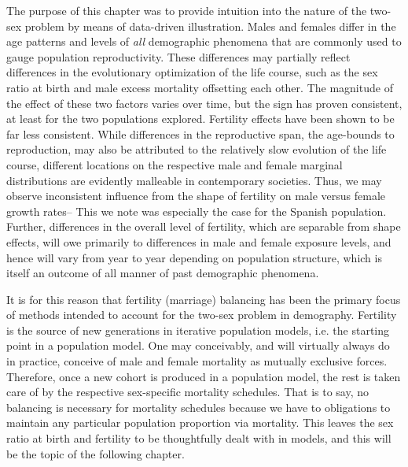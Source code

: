 \FloatBarrier

The purpose of this chapter was to provide intuition into the nature of the
two-sex problem by means of data-driven illustration. Males and females differ
in the age patterns and levels of \textit{all} demographic phenomena that are
commonly used to gauge population reproductivity. These differences may partially reflect
differences in the evolutionary optimization of the life course, such as the sex 
ratio at birth and male excess mortality offsetting each
other. The magnitude of the effect of these two factors varies over time, but
the sign has proven consistent, at least for the two populations explored.
Fertility effects have been shown to be far less consistent. While differences
in the reproductive span, the age-bounds to reproduction, may also be attributed
to the relatively slow evolution of the life course, different locations on the
respective male and female marginal distributions are evidently malleable in
contemporary societies. Thus, we may observe inconsistent influence from the shape of
fertility on male versus female growth rates-- This we note was especially the 
case for the Spanish population. Further, differences in the
overall level of fertility, which are separable from shape effects, will 
owe primarily to differences in male and female exposure levels, and hence will vary
from year to year depending on population structure, which is itself an outcome
of all manner of past demographic phenomena.

It is for this reason that fertility (marriage) balancing has been the primary
focus of methods intended to account for the two-sex problem in demography.
Fertility is the source of new generations in iterative population models, i.e.
the starting point in a population model. One may conceivably, and will virtually
always do in practice, conceive of male and female mortality as mutually
exclusive forces. Therefore, once a new cohort is produced in a population
model, the rest is taken care of by the respective sex-specific mortality
schedules. That is to say, no balancing is necessary for mortality schedules
because we have to obligations to maintain any particular population
proportion via mortality. This leaves the sex ratio at birth and fertility to
be thoughtfully dealt with in models, and this will be the topic of the following chapter.
